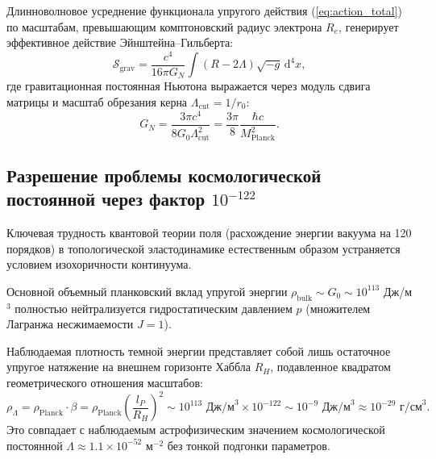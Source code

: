 \documentclass[12pt,a4paper]{article}
\theoremstyle{definition}
\theoremstyle{remark}
\begin{document}
Длинноволновое усреднение функционала упругого действия (\ref{eq:action_total}) по масштабам, превышающим комптоновский радиус электрона $R_e$, генерирует эффективное действие Эйнштейна--Гильберта:
\begin{equation}
	\mathcal{S}_{\mathrm{grav}} = \frac{c^4}{16\pi G_N} \int \left( R - 2\Lambda \right) \sqrt{-g} \, \mathrm{d}^4 x,
	\label{eq:einstein_hilbert}
\end{equation}
где гравитационная постоянная Ньютона выражается через модуль сдвига матрицы и масштаб обрезания керна $\Lambda_{\mathrm{cut}} = 1/r_0$:
\begin{equation}
	G_N = \frac{3\pi c^4}{8 G_0 \Lambda_{\mathrm{cut}}^2} = \frac{3\pi}{8} \frac{\hbar c}{M_{\mathrm{Planck}}^2}.
	\label{eq:newton_constant}
\end{equation}

\subsection{Разрешение проблемы космологической постоянной через фактор $10^{-122}$}
Ключевая трудность квантовой теории поля (расхождение энергии вакуума на 120 порядков) в топологической эластодинамике естественным образом устраняется условием изохоричности континуума.

Основной объемный планковский вклад упругой энергии $\rho_{\mathrm{bulk}} \sim G_0 \sim 10^{113}$ Дж/м$^3$ полностью нейтрализуется гидростатическим давлением $p$ (множителем Лагранжа несжимаемости $J=1$). 

Наблюдаемая плотность темной энергии представляет собой лишь остаточное упругое натяжение на внешнем горизонте Хаббла $R_H$, подавленное квадратом геометрического отношения масштабов:
\begin{equation}
	\rho_{\Lambda} = \rho_{\mathrm{Planck}} \cdot \beta = \rho_{\mathrm{Planck}} \left(\frac{l_P}{R_H}\right)^2 \sim 10^{113} \text{ Дж/м}^3 \times 10^{-122} \sim 10^{-9} \text{ Дж/м}^3 \approx 10^{-29} \text{ г/см}^3.
	\label{eq:dark_energy_resolved}
\end{equation}
Это совпадает с наблюдаемым астрофизическим значением космологической постоянной $\Lambda \approx 1.1 \times 10^{-52}\text{ м}^{-2}$ без тонкой подгонки параметров.
\end{document}
